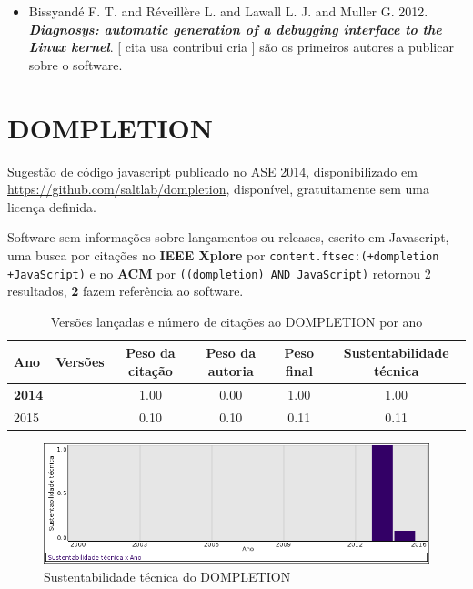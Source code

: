 \begin{itemize}
\item Bissyandé F. T. and Réveillère L. and Lawall L. J. and Muller G.
      2012.
        \textbf{\textit{ Diagnosys: automatic generation of a debugging interface to the Linux kernel}}.
      [
          cita
          usa
          contribui
          cria
      ]
são os primeiros autores a publicar sobre o software.
\end{itemize}
\section{DOMPLETION}

Sugestão de código javascript
publicado no ASE 2014,
disponibilizado em \url{https://github.com/saltlab/dompletion},
disponível,
gratuitamente
sem uma licença definida.

Software sem informações sobre lançamentos ou releases,
escrito em Javascript,
uma busca por citações no {\bf IEEE Xplore} por
\texttt{content.ftsec:(+dompletion +JavaScript)}
e no {\bf ACM} por
\texttt{((dompletion) AND JavaScript)}
retornou
2 resultados,
{\bf 2} fazem referência ao software.


\begin{table}[H]
\caption{Versões lançadas e número de citações ao DOMPLETION por ano}
\centering
\begin{tabular}{| l | c | c | c | c | c |}
  \hline
  Ano & Versões & Peso da citação & Peso da autoria & Peso final & Sustentabilidade técnica \\
  \hline
            {\bf 2014}
          &
          
          &
          1.00
          &
          0.00
          &
          1.00
          &
            {\color{blue} 1.00}
          \\
\hline
            2015
          &
          
          &
          0.10
          &
          0.10
          &
          0.11
          &
            {\color{red} 0.11}
          \\
\hline
\end{tabular}
\end{table}

\begin{figure}[h]
  \center
  \includegraphics[scale=0.50]{imagens/softwares-charts/dompletion.png}
  \caption{Sustentabilidade técnica do DOMPLETION}
\end{figure}


